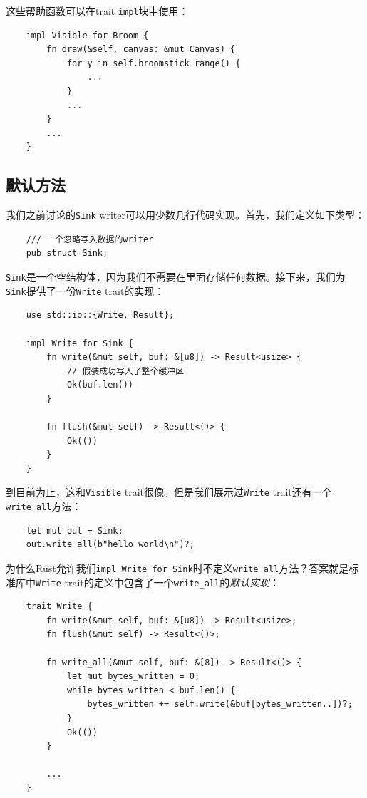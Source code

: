 这些帮助函数可以在trait \texttt{impl}块中使用：
\begin{verbatim}
    impl Visible for Broom {
        fn draw(&self, canvas: &mut Canvas) {
            for y in self.broomstick_range() {
                ...
            }
            ...
        }
        ...
    }
\end{verbatim}

\subsection{默认方法}
我们之前讨论的\texttt{Sink} writer可以用少数几行代码实现。首先，我们定义如下类型：
\begin{verbatim}
    /// 一个忽略写入数据的writer
    pub struct Sink;
\end{verbatim}

\texttt{Sink}是一个空结构体，因为我们不需要在里面存储任何数据。接下来，我们为\texttt{Sink}提供了一份\texttt{Write} trait的实现：
\begin{verbatim}
    use std::io::{Write, Result};

    impl Write for Sink {
        fn write(&mut self, buf: &[u8]) -> Result<usize> {
            // 假装成功写入了整个缓冲区
            Ok(buf.len())
        }

        fn flush(&mut self) -> Result<()> {
            Ok(())
        }
    }
\end{verbatim}

到目前为止，这和\texttt{Visible} trait很像。但是我们展示过\texttt{Write} trait还有一个\texttt{write\_all}方法：
\begin{verbatim}
    let mut out = Sink;
    out.write_all(b"hello world\n")?;
\end{verbatim}

为什么Rust允许我们\texttt{impl Write for Sink}时不定义\texttt{write\_all}方法？答案就是标准库中\texttt{Write} trait的定义中包含了一个\texttt{write\_all}的\emph{默认实现}：
\begin{verbatim}
    trait Write {
        fn write(&mut self, buf: &[u8]) -> Result<usize>;
        fn flush(&mut self) -> Result<()>;
        
        fn write_all(&mut self, buf: &[8]) -> Result<()> {
            let mut bytes_written = 0;
            while bytes_written < buf.len() {
                bytes_written += self.write(&buf[bytes_written..])?;
            }
            Ok(())            
        }

        ...
    }
\end{verbatim}

